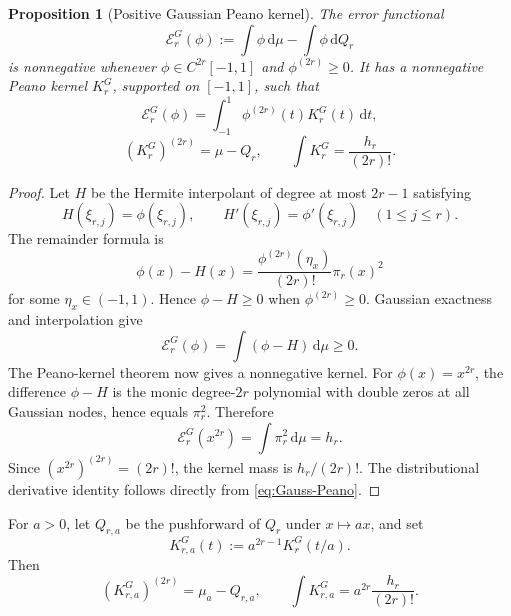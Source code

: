 \documentclass[11pt]{article}
\numberwithin{equation}{section}
\newtheorem{proposition}[theorem]{Proposition}
\theoremstyle{definition}
\theoremstyle{remark}
\newcommand{\dd}{\,\mathrm d}
\begin{document}
\begin{proposition}[Positive Gaussian Peano kernel]
\label{prop:gauss-kernel}
The error functional
\begin{equation}
 \mathcal E_r^G(\phi):=\int\phi\dd\mu-\int\phi\dd Q_r
 \label{eq:Gauss-functional}
\end{equation}
is nonnegative whenever $\phi\in C^{2r}[-1,1]$ and $\phi^{(2r)}\ge0$.  It has a nonnegative Peano kernel $K_r^G$, supported on $[-1,1]$, such that
\begin{equation}
 \mathcal E_r^G(\phi)=\int_{-1}^{1}\phi^{(2r)}(t)K_r^G(t)\dd t,
 \label{eq:Gauss-Peano}
\end{equation}
\begin{equation}
 (K_r^G)^{(2r)}=\mu-Q_r,
 \qquad
 \int K_r^G=\frac{h_r}{(2r)!}.
 \label{eq:Gauss-kernel-mass}
\end{equation}
\end{proposition}

\begin{proof}
Let $H$ be the Hermite interpolant of degree at most $2r-1$ satisfying
\[
 H(\xi_{r,j})=\phi(\xi_{r,j}),
 \qquad
 H'(\xi_{r,j})=\phi'(\xi_{r,j})
 \quad(1\le j\le r).
\]
The remainder formula is
\begin{equation}
 \phi(x)-H(x)=\frac{\phi^{(2r)}(\eta_x)}{(2r)!}\pi_r(x)^2
 \label{eq:Hermite-Gauss-remainder}
\end{equation}
for some $\eta_x\in(-1,1)$.  Hence $\phi-H\ge0$ when $\phi^{(2r)}\ge0$.  Gaussian exactness and interpolation give
\[
 \mathcal E_r^G(\phi)
 =\int(\phi-H)\dd\mu\ge0.
\]
The Peano-kernel theorem now gives a nonnegative kernel.  For $\phi(x)=x^{2r}$, the difference $\phi-H$ is the monic degree-$2r$ polynomial with double zeros at all Gaussian nodes, hence equals $\pi_r^2$.  Therefore
\[
 \mathcal E_r^G(x^{2r})=\int\pi_r^2\dd\mu=h_r.
\]
Since $(x^{2r})^{(2r)}=(2r)!$, the kernel mass is $h_r/(2r)!$.  The distributional derivative identity follows directly from \eqref{eq:Gauss-Peano}.
\end{proof}

For $a>0$, let $Q_{r,a}$ be the pushforward of $Q_r$ under $x\mapsto ax$, and set
\begin{equation}
 K_{r,a}^G(t):=a^{2r-1}K_r^G(t/a).
 \label{eq:scaled-G-kernel}
\end{equation}
Then
\begin{equation}
 (K_{r,a}^G)^{(2r)}=\mu_a-Q_{r,a},
 \qquad
 \int K_{r,a}^G=a^{2r}\frac{h_r}{(2r)!}.
 \label{eq:scaled-G-properties}
\end{equation}
\end{document}
